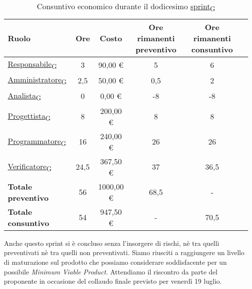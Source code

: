 \newpage
{}
\begin{table}[!h]
    \centering
    \begin{tabular}{ | l | c | c | c | c | c | }
        \hline
        \textbf{Ruolo} & \textbf{Ore} & \textbf{Costo} & \textbf{Ore rimanenti preventivo} & \textbf{Ore rimanenti consuntivo} \\
        \hline
        \href{https://7last.github.io/docs/rtb/documentazione-interna/glossario\#responsabile}{Responsabile\textsubscript{G}}     &  3   &   90,00 € &   5   &   6   \\
        \href{https://7last.github.io/docs/rtb/documentazione-interna/glossario\#amministratore}{Amministratore\textsubscript{G}} &  2,5 &   50,00 € &   0,5 &   2   \\
        \href{https://7last.github.io/docs/rtb/documentazione-interna/glossario\#analista}{Analista\textsubscript{G}}             &  0   &    0,00 € &  -8   &  -8   \\
        \href{https://7last.github.io/docs/rtb/documentazione-interna/glossario\#progettista}{Progettista\textsubscript{G}}       &  8   &  200,00 € &   8   &   8   \\
        \href{https://7last.github.io/docs/rtb/documentazione-interna/glossario\#programmatore}{Programmatore\textsubscript{G}}   & 16   &  240,00 € &  26   &  26   \\
        \href{https://7last.github.io/docs/rtb/documentazione-interna/glossario\#verificatore}{Verificatore\textsubscript{G}}     & 24,5 &  367,50 € &  37   &  36,5 \\
        \hline
        \textbf{Totale preventivo} & 56   & 1000,00 € &  68,5 &   -   \\
        \hline
        \textbf{Totale consuntivo} & 54   &  947,50 € &   -   &  70,5 \\
        \hline
    \end{tabular}
    \caption{Consuntivo economico durante il dodicesimo \href{https://7last.github.io/docs/rtb/documentazione-interna/glossario\#sprint}{sprint\textsubscript{G}}}
\end{table}

Anche questo sprint si è concluso senza l'insorgere di rischi, nè tra quelli preventivati nè tra quelli non preventivati. Siamo riusciti a raggiungere un livello di maturazione sul prodotto che possiamo considerare soddisfacente per un possibile \textit{Minimum Viable Product}. Attendiamo il riscontro da parte del proponente in occasione del collaudo finale previsto per venerdì 19 luglio.



